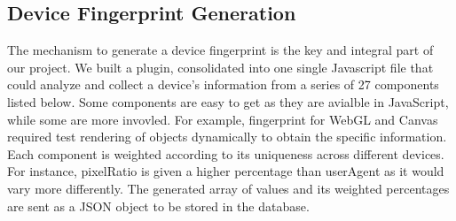 \documentclass{acm_proc_article-sp}
\begin{document}
\subsection{Device Fingerprint Generation}
The mechanism to generate a device fingerprint is the key and integral part of our project. We built a plugin, consolidated into one single Javascript file that could analyze and collect a device’s information from a series of 27 components listed below. 
Some components are easy to get as they are avialble in JavaScript, while some are more invovled. For example, fingerprint for WebGL and Canvas required test rendering of objects dynamically to obtain the specific information. 
Each component is weighted according to its uniqueness across different devices. For instance, pixelRatio is given a higher percentage than userAgent as it would vary more differently. The generated array of values and its weighted percentages are sent as a JSON object to be stored in the database. 
\end{document}
